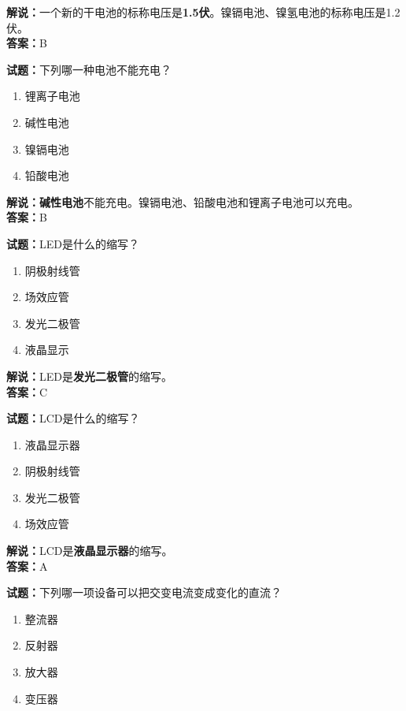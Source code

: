 \documentclass{ctexbook}
\begin{document}
\noindent\textbf{解说：}一个新的干电池的标称电压是\textbf{\num{1.5}伏}。镍镉电池、镍氢电池的标称电压是\num{1.2}伏。\\\noindent\textbf{答案：}B

\bigskip

\noindent\textbf{试题：}下列哪一种电池不能充电？

\begin{enumerate}[leftmargin=3em]
  \item 锂离子电池
  \item 碱性电池
  \item 镍镉电池
  \item 铅酸电池
\end{enumerate}

\noindent\textbf{解说：碱性电池}不能充电。镍镉电池、铅酸电池和锂离子电池可以充电。\\\noindent\textbf{答案：}B
\bigskip

\noindent\textbf{试题：}LED是什么的缩写？

\begin{enumerate}[leftmargin=3em]
  \item 阴极射线管
  \item 场效应管
  \item 发光二极管
  \item 液晶显示
\end{enumerate}

\noindent\textbf{解说：}LED是\textbf{发光二极管}的缩写。\\\noindent\textbf{答案：}C

\bigskip

\noindent\textbf{试题：}LCD是什么的缩写？

\begin{enumerate}[leftmargin=3em]
  \item 液晶显示器
  \item 阴极射线管
  \item 发光二极管
  \item 场效应管
\end{enumerate}

\noindent\textbf{解说：}LCD是\textbf{液晶显示器}的缩写。\\\noindent\textbf{答案：}A

\bigskip

\noindent\textbf{试题：}下列哪一项设备可以把交变电流变成变化的直流？

\begin{enumerate}[leftmargin=3em]
  \item 整流器
  \item 反射器
  \item 放大器
  \item 变压器
\end{enumerate}
\end{document}
